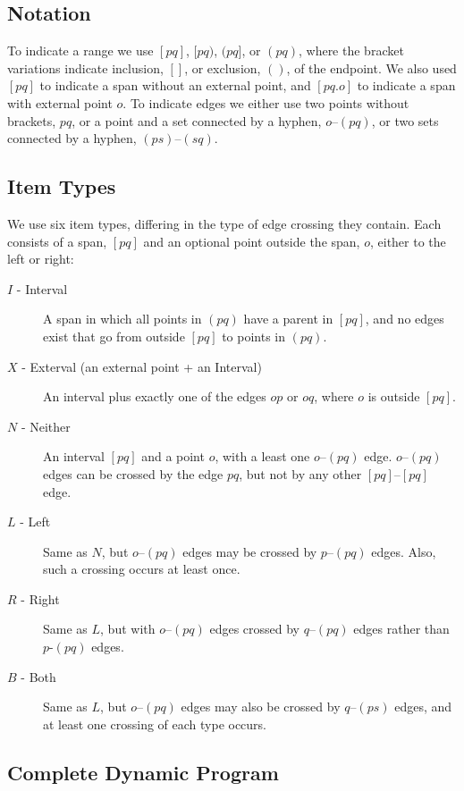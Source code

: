 \subsection{Notation}

To indicate a range we use $[pq]$, $[pq)$, $(pq]$, or $(pq)$, where the bracket variations indicate inclusion, $[]$, or exclusion, $()$, of the endpoint.
We also used $[pq]$ to indicate a span without an external point, and $[pq.o]$ to indicate a span with external point $o$.
To indicate edges we either use two points without brackets, \myeg $pq$, or a point and a set connected by a hyphen, \myeg $o$--$(pq)$, or two sets connected by a hyphen, \myeg $(ps)$--$(sq)$.

\subsection{Item Types}

We use six item types, differing in the type of edge crossing they contain.
Each consists of a span, $[pq]$ and an optional point outside the span, $o$, either to the left or right:

\begin{description}
  \item[$I$ - Interval]
  A span in which all points in $(pq)$ have a parent in $[pq]$, and no edges exist that go from outside $[pq]$ to points in $(pq)$.
  \item[$X$ - Exterval (an external point + an Interval)]
  An interval plus exactly one of the edges $op$ or $oq$, where $o$ is outside $[pq]$.
  \item[$N$ - Neither]
  An interval $[pq]$ and a point $o$, with a least one $o$--$(pq)$ edge.
  $o$--$(pq)$ edges can be crossed by the edge $pq$, but not by any other $[pq]$--$[pq]$ edge.
  \item[$L$ - Left]
  Same as $N$, but $o$--$(pq)$ edges may be crossed by $p$--$(pq)$ edges. Also, such a crossing occurs at least once. 
  \item[$R$ - Right]
  Same as $L$, but with $o$--$(pq)$ edges crossed by $q$--$(pq)$ edges rather than $p$-$(pq)$ edges.
  \item[$B$ - Both]
  Same as $L$, but $o$--$(pq)$ edges may also be crossed by $q$--$(ps)$ edges, and at least one crossing of each type occurs.
\end{description}

\subsection{Complete Dynamic Program}

